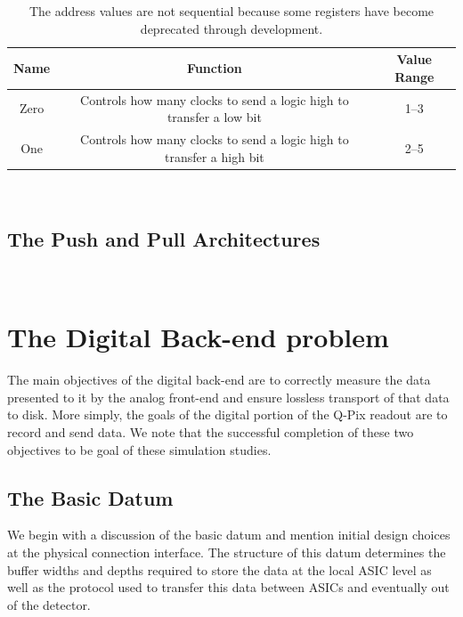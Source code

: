 \begin{table}
\begin{center}
\begin{tabular}{||c c c||}
 \hline
 Name & Function & Value Range\\ [0.5ex]
 \hline\hline
  Zero & Controls how many clocks to send a logic high to transfer a low bit & 1--3 \\
 \hline
  One & Controls how many clocks to send a logic high to transfer a high bit & 2--5 \\
 \hline
\end{tabular}
\caption{The address values are not sequential because some registers have become deprecated through development.}
\end{center}
\end{table}
~\label{table:node_registers}

\subsection{The Push and Pull Architectures}~\label{sec:architectures}


\section{The Digital Back-end problem}

The main objectives of the digital back-end are to correctly measure the data presented to it by the analog front-end and ensure lossless transport of that data to disk.
More simply, the goals of the digital portion of the Q-Pix readout are to record and send data.
We note that the successful completion of these two objectives to be goal of these simulation studies.

\subsection{The Basic Datum}

We begin with a discussion of the basic datum and mention initial design choices at the physical connection interface.
The structure of this datum determines the buffer widths and depths required to store the data at the local ASIC level as well as the protocol used to transfer this data between ASICs and eventually out of the detector.

